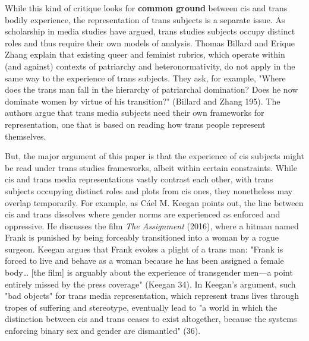 \documentclass[11pt]{article}
\author{fcalado}
\date{\today}
\title{}
\begin{document}
\tableofcontents

While this kind of critique looks for \textbf{\textbf{common ground}} between cis
and trans bodily experience, the representation of trans subjects is a
separate issue. As scholarship in media studies have argued, trans
studies subjects occupy distinct roles and thus require their own
models of analysis. Thomas Billard and Erique Zhang explain that
existing queer and feminist rubrics, which operate within (and
against) contexts of patriarchy and heteronormativity, do not apply in
the same way to the experience of trans subjects. They ask, for
example, "Where does the trans man fall in the hierarchy of
patriarchal domination? Does he now dominate women by virtue of his
transition?" (Billard and Zhang 195). The authors argue that trans
media subjects need their own frameworks for representation, one that
is based on reading how trans people represent themselves.

But, the major argument of this paper is that the experience of cis
subjects might be read under trans studies frameworks, albeit within
certain constraints. While cis and trans media representations vastly
contrast each other, with trans subjects occupying distinct roles and
plots from cis ones, they nonetheless may overlap temporarily. For
example, as Cáel M. Keegan points out, the line between cis and trans
dissolves where gender norms are experienced as enforced and
oppressive. He discusses the film \emph{The Assignment} (2016), where a
hitman named Frank is punished by being forceably transitioned into a
woman by a rogue surgeon. Keegan argues that Frank evokes a plight of
a trans man: "Frank is forced to live and behave as a woman because he
has been assigned a female body\ldots{} [the film] is arguably about the
experience of transgender men---a point entirely missed by the press
coverage" (Keegan 34). In Keegan's argument, such "bad objects" for
trans media representation, which represent trans lives through tropes
of suffering and stereotype, eventually lead to "a world in which the
distinction between cis and trans ceases to exist altogether, because
the systems enforcing binary sex and gender are dismantled" (36).
\end{document}
